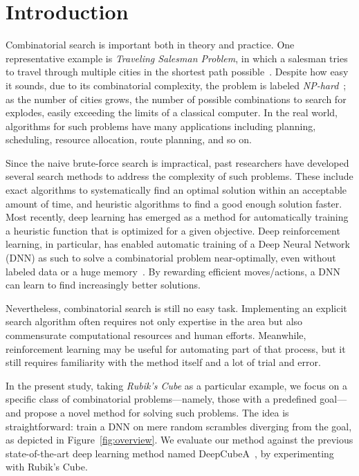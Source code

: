 \documentclass[nohyperref]{article}
\theoremstyle{plain}
\theoremstyle{definition}
\theoremstyle{remark}
\begin{document}
\section{Introduction}
Combinatorial search is important both in theory and practice.
One representative example is \textit{Traveling Salesman Problem}, in which a salesman tries to travel through multiple cities in the shortest path possible~\citep{applegate2011traveling, russell2021artificial}.
Despite how easy it sounds, due to its combinatorial complexity, the problem is labeled \textit{NP-hard}~\citep{papadimitriou1998combinatorial}; as the number of cities grows, the number of possible combinations to search for explodes, easily exceeding the limits of a classical computer.
In the real world, algorithms for such problems have many applications including planning, scheduling, resource allocation, route planning, and so on.

Since the naive brute-force search is impractical, past researchers have developed several search methods to address the complexity of such problems.
These include exact algorithms to systematically find an optimal solution within an acceptable amount of time, and heuristic algorithms to find a good enough solution faster.
Most recently, deep learning has emerged as a method for automatically training a heuristic function that is optimized for a given objective.
Deep reinforcement learning, in particular, has enabled automatic training of a Deep Neural Network (DNN) as such to solve a combinatorial problem near-optimally, even without labeled data or a huge memory~\citep{mazyavkina2021reinforcement,vesselinova2020learning}.
By rewarding efficient moves/actions, a DNN can learn to find increasingly better solutions.

Nevertheless, combinatorial search is still no easy task.
Implementing an explicit search algorithm often requires not only expertise in the area but also commensurate computational resources and human efforts.
Meanwhile, reinforcement learning may be useful for automating part of that process, but it still requires familiarity with the method itself and a lot of trial and error.

In the present study, taking \textit{Rubik's Cube} as a particular example, we focus on a specific class of combinatorial problems---namely, those with a predefined goal---and propose a novel method for solving such problems.
The idea is straightforward:
train a DNN on mere random scrambles diverging from the goal, as depicted in Figure~\ref{fig:overview}.
We evaluate our method against the previous state-of-the-art deep learning method named DeepCubeA~\citep{agostinelli2019solving}, by experimenting with Rubik's Cube.
\end{document}
